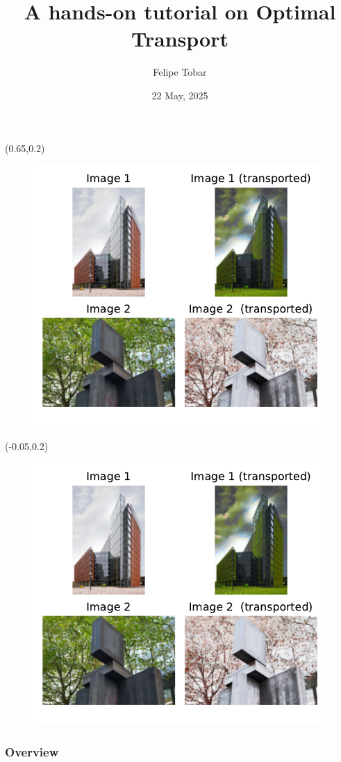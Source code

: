 \documentclass[pdf,aspectratio=169,10pt]{beamer}
\title[Tobar, A hands-on tutorial on Optimal Transport]{A hands-on tutorial on Optimal Transport
}
\author[]{Felipe Tobar}
\institute[]{Department of Mathematics \& I-X\\ Imperial College London}
\date{22 May, 2025}
\begin{document}
\begin{frame}[plain]
    \titlepage
    \footnotesize

    \begin{textblock}{0.45}(0.65,0.2)
        \begin{figure}
            \includegraphics[trim={7cm 5cm 1cm 1cm},clip, height=0.45\textwidth]{../img/ex1_result.pdf}
        \end{figure}
    \end{textblock}

    \begin{textblock}{0.45}(-0.05,0.2)
        \begin{figure}
            \includegraphics[trim={1cm 5cm 6.5cm 1cm},clip, height=0.45\textwidth]{../img/ex1_result.pdf}
        \end{figure}
    \end{textblock}



\end{frame}


\begin{frame}
    \frametitle{Overview} 
    \tableofcontents
\end{frame}
\end{document}

